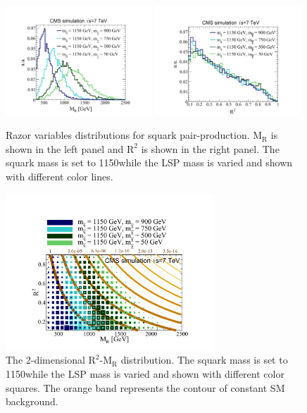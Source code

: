 \begin{figure}
 \centering
\includegraphics[width=0.49\textwidth]{RazorVariables/MR_Plot.pdf}
\includegraphics[width=0.49\textwidth]{RazorVariables/R2_Plot.pdf}
 \caption{Razor variables distributions for squark
   pair-production. $\mathrm{M_{R}}$ is shown in the left panel and
   $\mathrm{R^{2}}$ is shown in the right panel. The squark mass is
   set to 1150\GeV while the LSP mass is varied and shown with
   different color lines.\label{fig:RazorVar}}
\end{figure}
\begin{figure}
 \centering
\includegraphics[width=0.7\textwidth]{RazorVariables/MR_vs_Rsq_Plot.pdf}
\caption{The 2-dimensional $\mathrm{R^{2}}$-$\mathrm{M_{R}}$
  distribution. The squark mass is
   set to 1150\GeV while the LSP mass is varied and shown with
   different color squares. The orange band represents the contour of
   constant SM background.\label{fig:MRvsRsq}}
\end{figure} 


